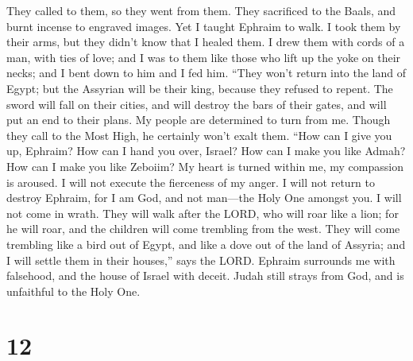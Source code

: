 They called to them, so they went from them. They sacrificed to the
Baals, and burnt incense to engraved images.  Yet I taught
Ephraim to walk. I took them by their arms, but they didn't know that I
healed them.  I drew them with cords of a man, with ties
of love; and I was to them like those who lift up the yoke on their
necks; and I bent down to him and I fed him.  ``They won't
return into the land of Egypt; but the Assyrian will be their king,
because they refused to repent.  The sword will fall on
their cities, and will destroy the bars of their gates, and will put an
end to their plans.  My people are determined to turn from
me. Though they call to the Most High, he certainly won't exalt them.
 ``How can I give you up, Ephraim? How can I hand you
over, Israel? How can I make you like Admah? How can I make you like
Zeboiim? My heart is turned within me, my compassion is aroused.
 I will not execute the fierceness of my anger. I will not
return to destroy Ephraim, for I am God, and not man---the Holy One
amongst you. I will not come in wrath.  They will walk
after the LORD, who will roar like a lion; for he will roar, and the
children will come trembling from the west.  They will
come trembling like a bird out of Egypt, and like a dove out of the land
of Assyria; and I will settle them in their houses,'' says the LORD.
 Ephraim surrounds me with falsehood, and the house of
Israel with deceit. Judah still strays from God, and is unfaithful to
the Holy One.

\hypertarget{section-6}{%
\section{12}\label{section-6}}


